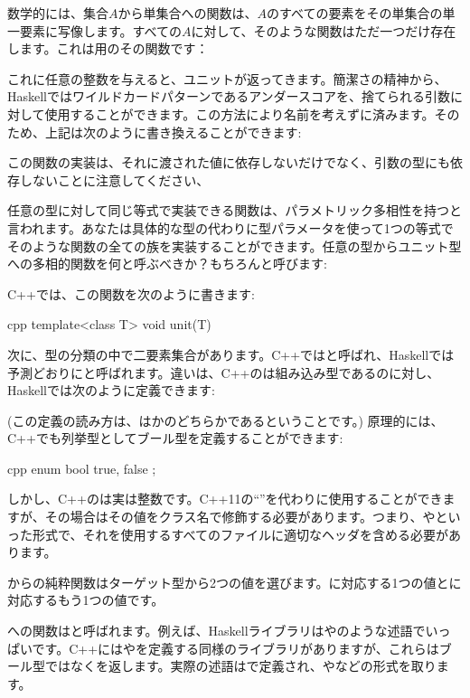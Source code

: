 数学的には、集合$A$から単集合への関数は、$A$のすべての要素をその単集合の単一要素に写像します。すべての$A$に対して、そのような関数はただ一つだけ存在します。これは用のその関数です：

これに任意の整数を与えると、ユニットが返ってきます。簡潔さの精神から、Haskellではワイルドカードパターンであるアンダースコアを、捨てられる引数に対して使用することができます。この方法により名前を考えずに済みます。そのため、上記は次のように書き換えることができます: 

この関数の実装は、それに渡された値に依存しないだけでなく、引数の型にも依存しないことに注意してください、

任意の型に対して同じ等式で実装できる関数は、パラメトリック多相性を持つと言われます。あなたは具体的な型の代わりに型パラメータを使って1つの等式でそのような関数の全ての族を実装することができます。任意の型からユニット型への多相的関数を何と呼ぶべきか？もちろんと呼びます: 

C++では、この関数を次のように書きます: 

\begin{snip}{cpp}
template<class T>
void unit(T) {}
\end{snip}
次に、型の分類の中で二要素集合があります。C++ではと呼ばれ、Haskellでは予測どおりにと呼ばれます。違いは、C++のは組み込み型であるのに対し、Haskellでは次のように定義できます: 

(この定義の読み方は、はかのどちらかであるということです。) 原理的には、C++でも列挙型としてブール型を定義することができます: 

\begin{snip}{cpp}
enum bool {
    true,
    false
};
\end{snip}
しかし、C++のは実は整数です。C++11の``''を代わりに使用することができますが、その場合はその値をクラス名で修飾する必要があります。つまり、やといった形式で、それを使用するすべてのファイルに適切なヘッダを含める必要があります。

からの純粋関数はターゲット型から2つの値を選びます。に対応する1つの値とに対応するもう1つの値です。

への関数はと呼ばれます。例えば、Haskellライブラリはやのような述語でいっぱいです。C++にはやを定義する同様のライブラリがありますが、これらはブール型ではなくを返します。実際の述語はで定義され、やなどの形式を取ります。

